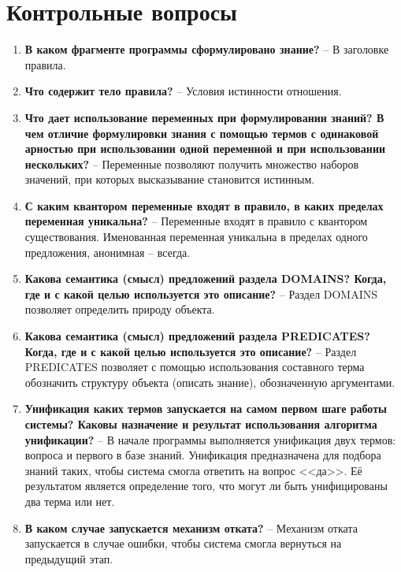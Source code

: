 \chapter{Контрольные вопросы}
\begin{enumerate}
	\item \textbf{В каком фрагменте программы сформулировано знание?} -- В заголовке правила.
	\item \textbf{Что содержит тело правила?} -- Условия истинности отношения.
	\item \textbf{Что дает использование переменных при формулировании знаний? В чем отличие формулировки знания с помощью термов с одинаковой арностью при использовании одной переменной и при использовании нескольких?} -- Переменные позволяют получить множество наборов значений, при которых высказывание становится истинным.
	\item \textbf{С каким квантором переменные входят в правило, в каких пределах переменная уникальна?} -- Переменные входят в правило с квантором существования. Именованная переменная уникальна в пределах одного предложения, анонимная -- всегда.
	\item \textbf{Какова семантика (смысл) предложений раздела DOMAINS? Когда, где и с какой целью используется это описание?} -- Раздел DOMAINS позволяет определить природу объекта.
	\item \textbf{Какова семантика (смысл) предложений раздела PREDICATES? Когда, где и с какой целью используется это описание?} -- Раздел PREDICATES позволяет с помощью использования составного терма обозначить структуру объекта (описать знание), обозначенную аргументами.
	\item \textbf{Унификация каких термов запускается на самом первом шаге работы системы? Каковы назначение и результат использования алгоритма унификации?} -- 
	В начале программы выполняется унификация двух термов: вопроса и первого в базе знаний. Унификация предназначена для подбора знаний таких, чтобы система смогла ответить на вопрос <<да>>. Её результатом является определение того, что могут ли быть унифицированы два терма или нет.
	\item \textbf{В каком случае запускается механизм отката?} -- Механизм отката запускается в случае ошибки, чтобы система смогла вернуться на предыдущий этап.
	
\end{enumerate}
